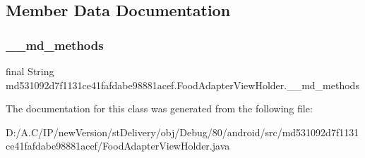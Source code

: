 \subsection{Member Data Documentation}
\mbox{\label{classmd531092d7f1131ce41fafdabe98881acef_1_1_food_adapter_view_holder_aadc4e0e7bdad48c8f4d3393d0986a3a4}} 
\subsubsection{\texorpdfstring{\+\_\+\+\_\+md\+\_\+methods}{\_\_md\_methods}}
{\footnotesize\ttfamily final String md531092d7f1131ce41fafdabe98881acef.\+Food\+Adapter\+View\+Holder.\+\_\+\+\_\+md\+\_\+methods\hspace{0.3cm}{\ttfamily [static]}}



The documentation for this class was generated from the following file\+:\begin{DoxyCompactItemize}
\item 
D\+:/\+A.\+C/\+I\+P/new\+Version/st\+Delivery/obj/\+Debug/80/android/src/md531092d7f1131ce41fafdabe98881acef/Food\+Adapter\+View\+Holder.\+java\end{DoxyCompactItemize}
